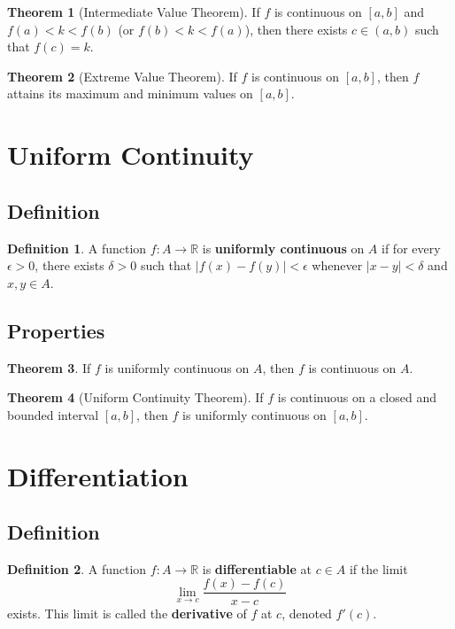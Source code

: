 \documentclass[11pt]{article}
\theoremstyle{definition}
\newtheorem{definition}{Definition}[section]
\newtheorem{theorem}{Theorem}[section]
\begin{document}
\begin{theorem}[Intermediate Value Theorem]
If $f$ is continuous on $[a,b]$ and $f(a) < k < f(b)$ (or $f(b) < k < f(a)$), then there exists $c \in (a,b)$ such that $f(c) = k$.
\end{theorem}

\begin{theorem}[Extreme Value Theorem]
If $f$ is continuous on $[a,b]$, then $f$ attains its maximum and minimum values on $[a,b]$.
\end{theorem}

\section{Uniform Continuity}

\subsection{Definition}
\begin{definition}
A function $f: A \to \mathbb{R}$ is \textbf{uniformly continuous} on $A$ if for every $\epsilon > 0$, there exists $\delta > 0$ such that $|f(x) - f(y)| < \epsilon$ whenever $|x - y| < \delta$ and $x,y \in A$.
\end{definition}

\subsection{Properties}
\begin{theorem}
If $f$ is uniformly continuous on $A$, then $f$ is continuous on $A$.
\end{theorem}

\begin{theorem}[Uniform Continuity Theorem]
If $f$ is continuous on a closed and bounded interval $[a,b]$, then $f$ is uniformly continuous on $[a,b]$.
\end{theorem}

\section{Differentiation}

\subsection{Definition}
\begin{definition}
A function $f: A \to \mathbb{R}$ is \textbf{differentiable} at $c \in A$ if the limit
$$\lim_{x \to c} \frac{f(x) - f(c)}{x - c}$$
exists. This limit is called the \textbf{derivative} of $f$ at $c$, denoted $f'(c)$.
\end{definition}
\end{document}

